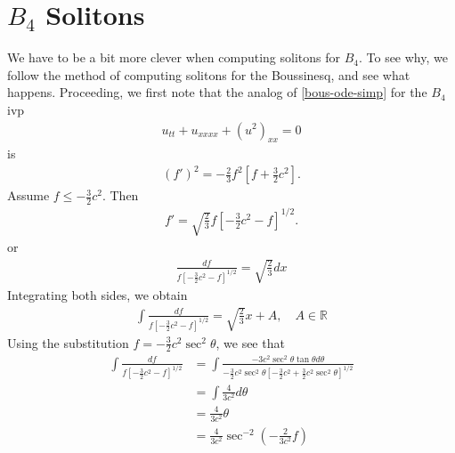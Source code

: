 \documentclass[12pt,reqno]{amsart}
\numberwithin{equation}{section}  %
\newcommand{\rr}{\mathbb{R}}
\begin{document}
\section{$B_{4}$ Solitons} 
\label{sec:B4-soliton-fail}
%
%
We have to be a bit more clever when computing solitons for $B_{4}$. To see why,
we follow the method of computing solitons for the Boussinesq, and see what
happens. Proceeding, we first note that the
analog of \eqref{bous-ode-simp} for the $B_{4}$ ivp
\begin{equation}
  \label{b4}
\begin{split}
  u_{tt} + u_{xxxx} + (u^{2})_{xx} = 0
\end{split}
\end{equation}
is
\begin{equation}
  \label{b4-ode-simp}
\begin{split}
  (f')^{2} = -\frac{2}{3} f^{2} \left [ f + \frac{3}{2}c^{2}\right ]. 
\end{split}
\end{equation}
Assume $f \le -\frac{3}{2}c^{2}$. Then 
%
\begin{equation*}
\begin{split}
  f' = \sqrt{\frac{2}{3}}f \left[ -\frac{3}{2}c^{2} -f \right]^{1/2}.
\end{split}
\end{equation*}
%
%
or
%
%
\begin{equation*}
\begin{split}
\frac{df}{ f \left[ -\frac{3}{2}c^{2} -f \right]^{1/2}} = \sqrt{\frac{2}{3}}
dx
\end{split}
\end{equation*}
%
Integrating both sides, we obtain
%
%
%
%
\begin{equation*}
\begin{split}
\int \frac{df}{ f \left[ -\frac{3}{2}c^{2} -f \right]^{1/2}} = \sqrt{\frac{2}{3}}
x + A, \quad A \in \rr
\end{split}
\end{equation*}
%
%
Using the substitution $f = -\frac{3}{2}c^{2}\sec^{2} \theta$, we see that
%
%
\begin{equation*}
\begin{split}
\int \frac{df}{ f \left[ -\frac{3}{2}c^{2} -f \right]^{1/2}} 
& = \int \frac{-3 c^{2} \sec^{2}\theta \tan \theta d
\theta}{-\frac{3}{2}c^{2} \sec^{2} \theta \left[ -\frac{3}{2}c^{2} +
\frac{3}{2}c^{2} \sec^{2} \theta \right]^{1/2}}
\\
& = \int \frac{4}{3c^{2}} d \theta
\\
& = \frac{4}{3c^{2}} \theta
\\
& = \frac{4}{3c^{2}} \sec^{-2}\left (-\frac{2}{3c^{2}}f \right )
\end{split}
\end{equation*}
\end{document}
